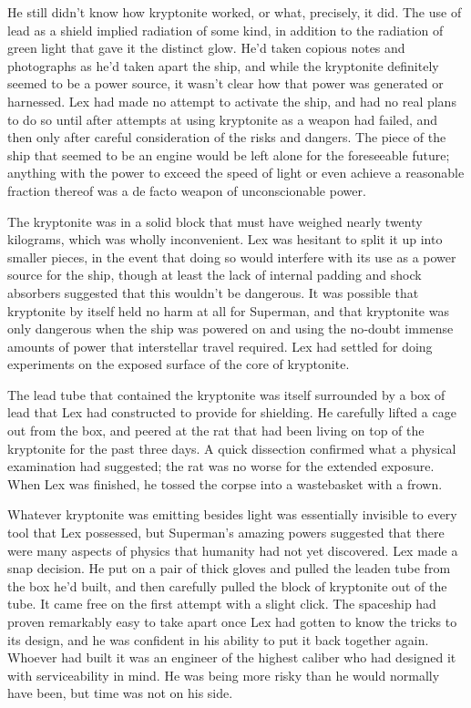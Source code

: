 \documentclass[ebook,12pt]{memoir}
\begin{document}
He still didn't know how kryptonite worked, or what, precisely, it did.
The use of lead as a shield implied radiation of some kind, in addition
to the radiation of green light that gave it the distinct glow. He'd
taken copious notes and photographs as he'd taken apart the ship, and
while the kryptonite definitely seemed to be a power source, it wasn't
clear how that power was generated or harnessed. Lex had made no attempt
to activate the ship, and had no real plans to do so until after
attempts at using kryptonite as a weapon had failed, and then only after
careful consideration of the risks and dangers. The piece of the ship
that seemed to be an engine would be left alone for the foreseeable
future; anything with the power to exceed the speed of light or even
achieve a reasonable fraction thereof was a de facto weapon of
unconscionable power.

The kryptonite was in a solid block that must have weighed nearly twenty
kilograms, which was wholly inconvenient. Lex was hesitant to split it
up into smaller pieces, in the event that doing so would interfere with
its use as a power source for the ship, though at least the lack of
internal padding and shock absorbers suggested that this wouldn't be
dangerous. It was possible that kryptonite by itself held no harm at all
for Superman, and that kryptonite was only dangerous when the ship was
powered on and using the no‐doubt immense amounts of power that
interstellar travel required. Lex had settled for doing experiments on
the exposed surface of the core of kryptonite.

The lead tube that contained the kryptonite was itself surrounded by a
box of lead that Lex had constructed to provide for shielding. He
carefully lifted a cage out from the box, and peered at the rat that had
been living on top of the kryptonite for the past three days. A quick
dissection confirmed what a physical examination had suggested; the rat
was no worse for the extended exposure. When Lex was finished, he tossed
the corpse into a wastebasket with a frown.

Whatever kryptonite was emitting besides light was essentially invisible
to every tool that Lex possessed, but Superman's amazing powers
suggested that there were many aspects of physics that humanity had not
yet discovered. Lex made a snap decision. He put on a pair of thick
gloves and pulled the leaden tube from the box he'd built, and then
carefully pulled the block of kryptonite out of the tube. It came free
on the first attempt with a slight click. The spaceship had proven
remarkably easy to take apart once Lex had gotten to know the tricks to
its design, and he was confident in his ability to put it back together
again. Whoever had built it was an engineer of the highest caliber who
had designed it with serviceability in mind. He was being more risky
than he would normally have been, but time was not on his side.
\end{document}
